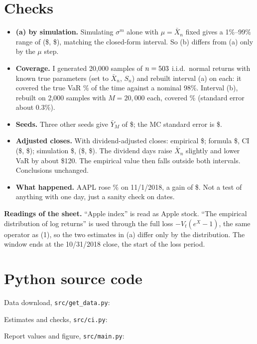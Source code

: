\documentclass[12pt]{article}
\newcommand{\1}{\mathbf{1}}
\theoremstyle{remark}
\begin{document}
\section*{Checks}
\begin{itemize}[leftmargin=*]
\item \textbf{(a) by simulation.} Simulating $\sigma^m$ alone with $\mu=\bar X_n$ fixed gives a 1\%--99\%
range of (\$\SimALo, \$\SimAHi), matching the closed-form interval. So (b) differs from (a) only by
the $\mu$ step.
\item \textbf{Coverage.} I generated 20{,}000 samples of $n=503$ i.i.d.\ normal returns with known true
parameters (set to $\bar X_n$, $S_n$) and rebuilt interval (a) on each: it covered the true VaR
\CoverA\% of the time against a nominal 98\%. Interval (b), rebuilt on 2{,}000 samples with
$M=20{,}000$ each, covered \CoverB\% (standard error about 0.3\%).
\item \textbf{Seeds.} Three other seeds give $\bar Y_M$ of \$\SeedMeans; the MC standard error is \$\YSE.
\item \textbf{Adjusted closes.} With dividend-adjusted closes: empirical \$\AdjEmp; formula \$\AdjPt,
CI (\$\AdjLo, \$\AdjHi); simulation \$\AdjY, (\$\AdjA, \$\AdjB). The dividend days raise
$\bar X_n$ slightly and lower VaR by about \$120. The empirical value then falls outside both
intervals. Conclusions unchanged.
\item \textbf{What happened.} AAPL rose \NextRet\% on 11/1/2018, a gain of \$\Realized. Not a test of
anything with one day, just a sanity check on dates.
\end{itemize}

\textbf{Readings of the sheet.} ``Apple index'' is read as Apple stock. ``The empirical distribution of
log returns'' is used through the full loss $-V_t(e^{X}-1)$, the same operator as (1), so the two
estimates in (a) differ only by the distribution. The window ends at the 10/31/2018 close, the
start of the loss period.

\begin{center}
\end{center}

\appendix
\section{Python source code}
Data download, \texttt{src/get\_data.py}:

Estimates and checks, \texttt{src/ci.py}:

Report values and figure, \texttt{src/main.py}:

\end{document}
